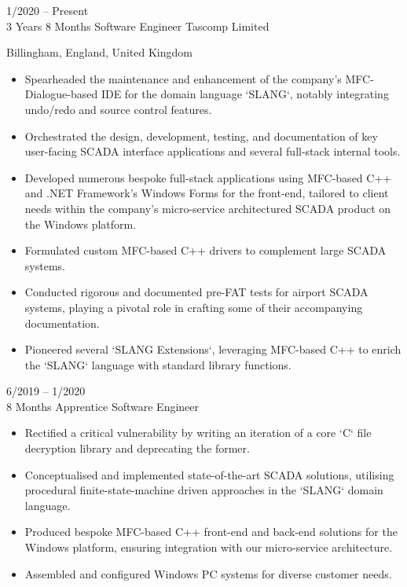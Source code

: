 \documentclass[9pt]{developercv} %
\begin{document}
\vspace{1cm}	

\pagebreak



\begin{entrylist}
	\entry
		{1/2020 -- Present\\3 Years 8 Months}
		{Software Engineer}
		{Tascomp Limited}
		{Billingham, England, United Kingdom
		
		\begin{itemize}
			\item[\ding{117}] Spearheaded the maintenance and enhancement of the company's MFC-Dialogue-based IDE for the domain language `SLANG`, notably integrating undo/redo and source control features.
			\item[\ding{117}] Orchestrated the design, development, testing, and documentation of key user-facing SCADA interface applications and several full-stack internal tools.
			\item[\ding{117}] Developed numerous bespoke full-stack applications using MFC-based C++ and .NET Framework's Windows Forms for the front-end, tailored to client needs within the company's micro-service architectured SCADA product on the Windows platform.
			\item[\ding{117}] Formulated custom MFC-based C++ drivers to complement large SCADA systems.
			\item[\ding{117}] Conducted rigorous and documented pre-FAT tests for airport SCADA systems, playing a pivotal role in crafting some of their accompanying documentation.
			\item[\ding{117}] Pioneered several `SLANG Extensions`, leveraging MFC-based C++ to enrich the `SLANG` language with standard library functions.
		\end{itemize}
		}
	\entry
		{6/2019 -- 1/2020\\8 Months}
		{Apprentice Software Engineer}
		{}
		{
		\begin{itemize}
			\item[\ding{117}] Rectified a critical vulnerability by writing an iteration of a core `C` file decryption library and deprecating the former.
			\item[\ding{117}] Conceptualised and implemented state-of-the-art SCADA solutions, utilising procedural finite-state-machine driven approaches in the `SLANG` domain language.
			\item[\ding{117}] Produced bespoke MFC-based C++ front-end and back-end solutions for the Windows platform, ensuring integration with our micro-service architecture.
			\item[\ding{117}] Assembled and configured Windows PC systems for diverse customer needs.
		\end{itemize}
		
}
\end{entrylist}
\end{document}

